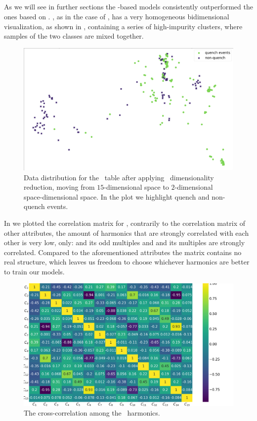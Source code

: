 \subsection{\phin}
\label{sec:phi}
As we will see in further sections the \phin-based models consistently outperformed the ones based
on \bn. \phin, as in the case of \bn, has a very homogeneous bidimensional visualization, as shown in
, containing a series of high-impurity clusters, where samples of the two classes are mixed together.
\begin{figure}[!ht]
	\centering
	\includegraphics[width=0.7\linewidth]{img/Phi_distribution.png}
	\caption{Data distribution for the \phin\ table after applying \pca\ dimensionality
		reduction, moving from $15$-dimensional space to $2$-dimensional space-dimensional
		space. In the plot we highlight quench and non-quench events.} \label{fig:phi-dist}
\end{figure}

In  we plotted the correlation matrix for \phin, contrarily to the correlation
matrix of other attributes, the amount of harmonics that are strongly correlated with each other is very
low, only: \phin[2] and its odd multiples and \phin[4] and its multiples are strongly correlated. Compared to the
aforementioned attributes the matrix contains no real structure, which leaves us freedom to choose
whichever harmonics are better to train our models.
\begin{figure}[!ht]
	\centering
	\includegraphics[width=\linewidth]{img/Phi_corr_matrix.png}
	\caption{The cross-correlation among the \phin\ harmonics.} \label{fig:phi-corr}
\end{figure}

